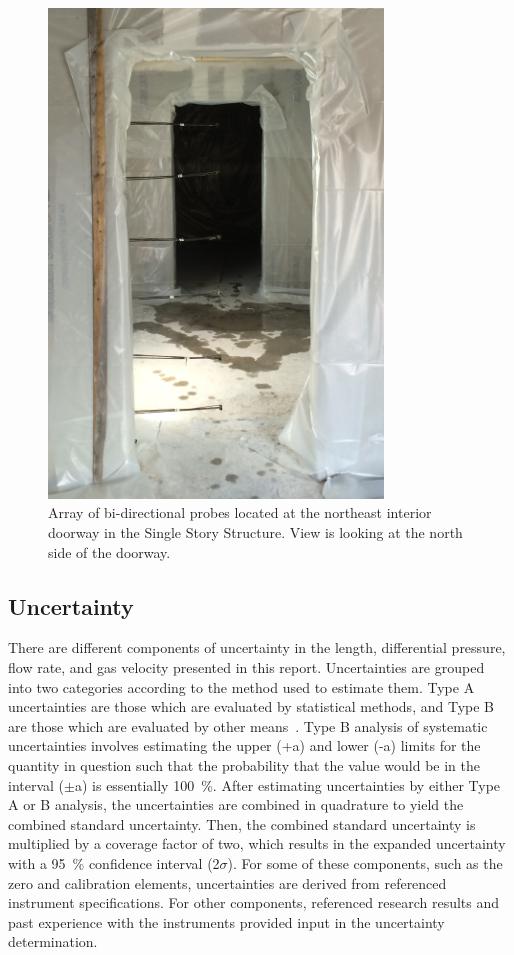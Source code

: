 \documentclass[12pt,oneside]{book}
\begin{document}
\begin{figure}[!ht]
	\includegraphics[width=3.5in]{../Figures/Pictures/BDPs_east}
	\caption[Array of bi-directional probes at interior doorway in Single Story Structure.]{Array of bi-directional probes located at the northeast interior doorway in the Single Story Structure. View is looking at the north side of the doorway.}
	\label{fig:BDPs}
\end{figure}
\FloatBarrier

\subsection{Uncertainty}
\label{sec:uncertainty}
There are different components of uncertainty in the length, differential pressure, flow rate, and gas velocity presented in this report. Uncertainties are grouped into two categories according to the method used to estimate them. Type A uncertainties are those which are evaluated by statistical methods, and Type B are those which are evaluated by other means~\cite{Taylor&Kuyatt:1994}. Type B analysis of systematic uncertainties involves estimating the upper (+a) and lower (-a) limits for the quantity in question such that the probability that the value would be in the interval ($\pm$a) is essentially 100~\%. After estimating uncertainties by either Type A or B analysis, the uncertainties are combined in quadrature to yield the combined standard uncertainty. Then, the combined standard uncertainty is multiplied by a coverage factor of two, which results in the expanded uncertainty with a 95~\% confidence interval (2$\sigma$). For some of these components, such as the zero and calibration elements, uncertainties are derived from referenced instrument specifications. For other components, referenced research results and past experience with the instruments provided input in the uncertainty determination. 
\end{document}

